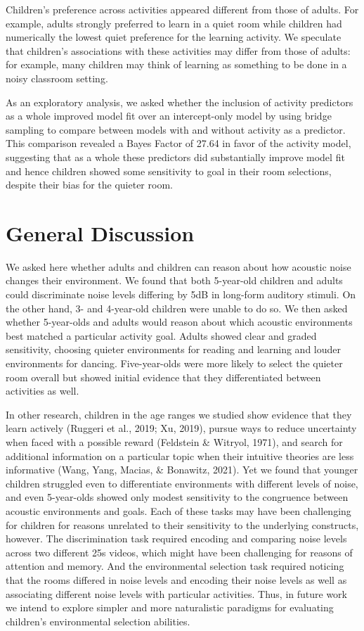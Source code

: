 \documentclass[10pt, letterpaper]{article}
\begin{document}
Children's preference across activities appeared different from those of
adults. For example, adults strongly preferred to learn in a quiet room
while children had numerically the lowest quiet preference for the
learning activity. We speculate that children's associations with these
activities may differ from those of adults: for example, many children
may think of learning as something to be done in a noisy classroom
setting.

As an exploratory analysis, we asked whether the inclusion of activity
predictors as a whole improved model fit over an intercept-only model by
using bridge sampling to compare between models with and without
activity as a predictor. This comparison revealed a Bayes Factor of
27.64 in favor of the activity model, suggesting that as a whole these
predictors did substantially improve model fit and hence children showed
some sensitivity to goal in their room selections, despite their bias
for the quieter room.

\hypertarget{general-discussion}{%
\section{General Discussion}\label{general-discussion}}

We asked here whether adults and children can reason about how acoustic
noise changes their environment. We found that both 5-year-old children
and adults could discriminate noise levels differing by 5dB in long-form
auditory stimuli. On the other hand, 3- and 4-year-old children were
unable to do so. We then asked whether 5-year-olds and adults would
reason about which acoustic environments best matched a particular
activity goal. Adults showed clear and graded sensitivity, choosing
quieter environments for reading and learning and louder environments
for dancing. Five-year-olds were more likely to select the quieter room
overall but showed initial evidence that they differentiated between
activities as well.

In other research, children in the age ranges we studied show evidence
that they learn actively (Ruggeri et al., 2019; Xu, 2019), pursue ways
to reduce uncertainty when faced with a possible reward (Feldstein \&
Witryol, 1971), and search for additional information on a particular
topic when their intuitive theories are less informative (Wang, Yang,
Macias, \& Bonawitz, 2021). Yet we found that younger children struggled
even to differentiate environments with different levels of noise, and
even 5-year-olds showed only modest sensitivity to the congruence
between acoustic environments and goals. Each of these tasks may have
been challenging for children for reasons unrelated to their sensitivity
to the underlying constructs, however. The discrimination task required
encoding and comparing noise levels across two different 25s videos,
which might have been challenging for reasons of attention and memory.
And the environmental selection task required noticing that the rooms
differed in noise levels and encoding their noise levels as well as
associating different noise levels with particular activities. Thus, in
future work we intend to explore simpler and more naturalistic paradigms
for evaluating children's environmental selection abilities.
\end{document}

